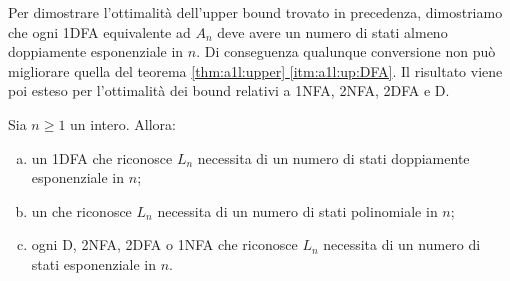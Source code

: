 Per dimostrare l'ottimalità dell'upper bound trovato in precedenza, dimostriamo che ogni 1DFA equivalente ad $A_n$ deve avere un numero di stati almeno doppiamente esponenziale in $n$. Di conseguenza qualunque conversione non può migliorare quella del teorema \hyperref[itm:a1l:up:DFA]{\ref{thm:a1l:upper} \ref{itm:a1l:up:DFA}}. Il risultato viene poi esteso per l'ottimalità dei bound relativi a 1NFA, 2NFA, 2DFA e D.
\begin{theor}\label{thm:a1l:lowLn}
	Sia $n\geq1$ un intero. Allora:
	\begin{enumerate}[(a)]
		\item \label{itm:a1l:lowLn:DFA} un 1DFA che riconosce $L_n$ necessita di un numero di stati doppiamente esponenziale in $n$;
		\item \label{itm:a1l:lowLn:1LA} un  che riconosce $L_n$ necessita di un numero di stati polinomiale in $n$;
		\item \label{itm:a1l:lowLn:NFA} ogni D, 2NFA, 2DFA o 1NFA che riconosce $L_n$ necessita di un numero di stati esponenziale in $n$.
	\end{enumerate}
\end{theor}
